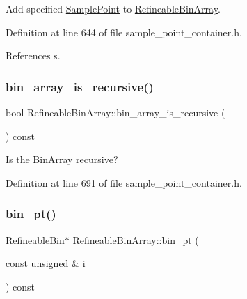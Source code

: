 Add specified \hyperlink{classSamplePoint}{Sample\+Point} to \hyperlink{classRefineableBinArray}{Refineable\+Bin\+Array}. 



Definition at line 644 of file sample\+\_\+point\+\_\+container.\+h.



References s.

\mbox{\label{classRefineableBinArray_a3450f66578018c21cb0e46a75788b6c3}} 
\subsubsection{\texorpdfstring{bin\+\_\+array\+\_\+is\+\_\+recursive()}{bin\_array\_is\_recursive()}}
{\footnotesize\ttfamily bool Refineable\+Bin\+Array\+::bin\+\_\+array\+\_\+is\+\_\+recursive (\begin{DoxyParamCaption}{ }\end{DoxyParamCaption}) const\hspace{0.3cm}{\ttfamily [inline]}}



Is the \hyperlink{classBinArray}{Bin\+Array} recursive? 



Definition at line 691 of file sample\+\_\+point\+\_\+container.\+h.

\mbox{\label{classRefineableBinArray_ad4a6e34791849b9f8349281cf416beaa}} 
\subsubsection{\texorpdfstring{bin\+\_\+pt()}{bin\_pt()}}
{\footnotesize\ttfamily \hyperlink{classRefineableBin}{Refineable\+Bin}$\ast$ Refineable\+Bin\+Array\+::bin\+\_\+pt (\begin{DoxyParamCaption}\item[{const unsigned \&}]{i }\end{DoxyParamCaption}) const\hspace{0.3cm}{\ttfamily [inline]}}



